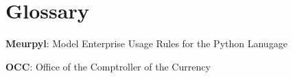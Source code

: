 \newcommand{\definition}[2]{
	\textbf{#1}: #2
}

\section{Glossary}

\thispagestyle{section_start_style}

\vspace*{.3cm}

\setlength{\parskip}{0em}

	\definition{Meurpyl}{Model Enterprise Usage Rules for the Python Lanugage}

	\definition{OCC}{Office of the Comptroller of the Currency}

\setlength{\parskip}{1em}